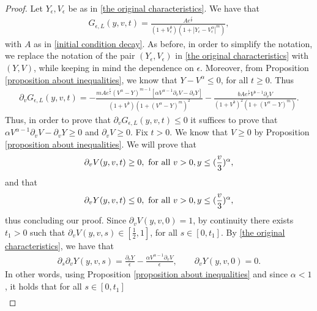 \documentclass[11pt]{article}
\numberwithin{equation}{section}
\begin{document}
 \begin{proof}
  Let $Y_{\epsilon}, V_{\epsilon}$ be as in \eqref{the original characteristics}.    We have that 
     \begin{align*}
         G_{\epsilon,L}(y,v,t)=\frac{A e^{\frac{t}{\epsilon}}}{(1+V_{\epsilon}^{b})(1+|Y_{\epsilon}-V_{\epsilon}^{\alpha}|^{m})},
     \end{align*}
with $A$ as in \eqref{initial condition decay}. As before, in order to simplify the notation, we replace the notation of the pair $(Y_{\epsilon},V_{\epsilon})$ in \eqref{the original characteristics} with $(Y,V)$, while keeping in mind the dependence on $\epsilon$.    Moreover, from Proposition \ref{proposition about inequalities}, we know that $Y-V^{\alpha}\leq 0$, for all $t\geq 0$. Thus
     \begin{align*}
         \partial_{v}G_{\epsilon,L}(y,v,t)=-\frac{mA e^{\frac{t}{\epsilon}}(V^{\alpha}-Y)^{m-1}[\alpha V^{\alpha-1}\partial_{v}V-\partial_{v}Y]}{(1+V^{b})(1+(V^{\alpha}-Y)^{m})^{2}}-\frac{b Ae^{\frac{t}{\epsilon}}V^{b-1}\partial_{v}V}{(1+V^{b})^{2}(1+(V^{\alpha}-Y)^{m})}.
     \end{align*}
     Thus, in order to prove that $\partial_{v}G_{\epsilon,L}(y,v,t)\leq 0$ it suffices to prove that $\alpha V^{\alpha-1}\partial_{v}V-\partial_{v}Y\geq 0$ and $\partial_{v}V\geq 0$. Fix $t>0$. We know that $V\geq 0$ by Proposition \ref{proposition about inequalities}. We will prove that
     \begin{align*}
         \partial_{v}V(y,v,t)\geq 0, \textup{ for all } v>0, y\leq (\frac{v}{3})^{\alpha},
     \end{align*}
     and that
     \begin{align*}
         \partial_{v}Y(y,v,t)\leq 0, \textup{ for all } v>0, y\leq (\frac{v}{3})^{\alpha},
     \end{align*}
     thus concluding our proof. Since $\partial_{v}V(y,v,0)=1$, by continuity there exists $t_{1}>0$ such that $\partial_{v}V(y,v,s)\in[\frac{1}{2},1]$, for all $s\in[0,t_{1}]$. By \eqref{the original characteristics}, we have that
     \begin{align*}
         \partial_{s}\partial_{v}Y(y,v,s)=\frac{\partial_{v}Y}{\epsilon}-\frac{\alpha V^{\alpha-1}\partial_{v}V}{\epsilon}, \qquad \partial_{v}Y(y,v,0)=0.
     \end{align*}
     In other words, using Proposition \ref{proposition about inequalities} and since $\alpha<1$, it holds that for all $s\in[0,t_{1}]$ 
     \begin{align*}

\end{align*}
\end{proof}
\end{document}
